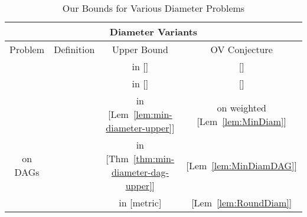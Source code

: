 \begin{table*}\centering\small
\begin{tabular}{|c | c | c | c|}
\hline 
\multicolumn{4}{|c|}{Diameter Variants} \\
\hline
Problem & Definition & Upper Bound & OV Conjecture \\
\hline
  \UndirectedDiameter{} &
   &
   in  [\cite{RV13}] &
    [\cite{RV13}]\\
\hline
  \MaxDiameter{} &
   &
   in  [\cite{RV13}] &
   [\cite{RV13}] \\
\hline
  \MinDiameter{} &
   &
   in  [Lem~\ref{lem:min-diameter-upper}] &
   on weighted  [Lem~\ref{lem:MinDiam}] \\
\hline
  \MinDiameter{} on DAGs &
   &
   in  [Thm~\ref{thm:min-diameter-dag-upper}] &
    [Lem~\ref{lem:MinDiamDAG}] \\
\hline
  \RoundtripDiameter{} &
   &
   in  [metric]&
   [Lem~\ref{lem:RoundDiam}] \\
\hline
\end{tabular}
\caption{Our Bounds for Various Diameter Problems}
\label{tab:res-diam}
\end{table*}
